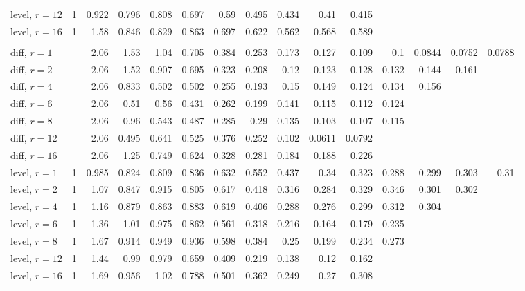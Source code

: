 \begin{table}[t]
\begin{tabular}{lrrrrrrrrrrrrrr}
\quad level, $r{=}12$ & 1 & \underline{0.922} & 0.796 & 0.808 & 0.697 & 0.59 & 0.495 & 0.434 & 0.41 & 0.415 &  &  &  &  \\
\quad level, $r{=}16$ & 1 & 1.58 & 0.846 & 0.829 & 0.863 & 0.697 & 0.622 & 0.562 & 0.568 & 0.589 &  &  &  &  \\
\addlinespace
\multicolumn{15}{l}{\textit{Chronos-2 L}} \\
\quad diff, $r{=}1$ &  & 2.06 & 1.53 & 1.04 & 0.705 & 0.384 & 0.253 & 0.173 & 0.127 & 0.109 & 0.1 & 0.0844 & 0.0752 & 0.0788 \\
\quad diff, $r{=}2$ &  & 2.06 & 1.52 & 0.907 & 0.695 & 0.323 & 0.208 & 0.12 & 0.123 & 0.128 & 0.132 & 0.144 & 0.161 &  \\
\quad diff, $r{=}4$ &  & 2.06 & 0.833 & 0.502 & 0.502 & 0.255 & 0.193 & 0.15 & 0.149 & 0.124 & 0.134 & 0.156 &  &  \\
\quad diff, $r{=}6$ &  & 2.06 & 0.51 & 0.56 & 0.431 & 0.262 & 0.199 & 0.141 & 0.115 & 0.112 & 0.124 &  &  &  \\
\quad diff, $r{=}8$ &  & 2.06 & 0.96 & 0.543 & 0.487 & 0.285 & 0.29 & 0.135 & 0.103 & 0.107 & 0.115 &  &  &  \\
\quad diff, $r{=}12$ &  & 2.06 & 0.495 & 0.641 & 0.525 & 0.376 & 0.252 & 0.102 & 0.0611 & 0.0792 &  &  &  &  \\
\quad diff, $r{=}16$ &  & 2.06 & 1.25 & 0.749 & 0.624 & 0.328 & 0.281 & 0.184 & 0.188 & 0.226 &  &  &  &  \\
\quad level, $r{=}1$ & 1 & 0.985 & 0.824 & 0.809 & 0.836 & 0.632 & 0.552 & 0.437 & 0.34 & 0.323 & 0.288 & 0.299 & 0.303 & 0.31 \\
\quad level, $r{=}2$ & 1 & 1.07 & 0.847 & 0.915 & 0.805 & 0.617 & 0.418 & 0.316 & 0.284 & 0.329 & 0.346 & 0.301 & 0.302 &  \\
\quad level, $r{=}4$ & 1 & 1.16 & 0.879 & 0.863 & 0.883 & 0.619 & 0.406 & 0.288 & 0.276 & 0.299 & 0.312 & 0.304 &  &  \\
\quad level, $r{=}6$ & 1 & 1.36 & 1.01 & 0.975 & 0.862 & 0.561 & 0.318 & 0.216 & 0.164 & 0.179 & 0.235 &  &  &  \\
\quad level, $r{=}8$ & 1 & 1.67 & 0.914 & 0.949 & 0.936 & 0.598 & 0.384 & 0.25 & 0.199 & 0.234 & 0.273 &  &  &  \\
\quad level, $r{=}12$ & 1 & 1.44 & 0.99 & 0.979 & 0.659 & 0.409 & 0.219 & 0.138 & 0.12 & 0.162 &  &  &  &  \\
\quad level, $r{=}16$ & 1 & 1.69 & 0.956 & 1.02 & 0.788 & 0.501 & 0.362 & 0.249 & 0.27 & 0.308 &  &  &  &  \\

\end{tabular}
\end{table}
